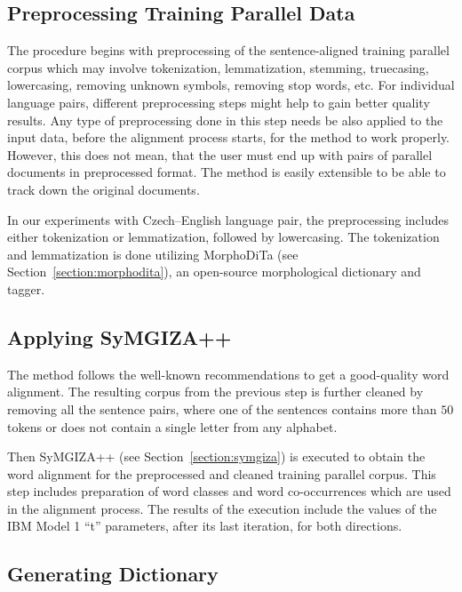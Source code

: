 \subsection{Preprocessing Training Parallel Data}
\label{subsection:preprocessing_training_parallel_data}

The procedure begins with preprocessing of the sentence-aligned training parallel corpus which may involve tokenization, lemmatization, stemming, truecasing, lowercasing, removing unknown symbols, removing stop words, etc. For individual language pairs, different preprocessing steps might help to gain better quality results. Any type of preprocessing done in this step needs be also applied to the input data, before the alignment process starts, for the method to work properly. However, this does not mean, that the user must end up with pairs of parallel documents in preprocessed format. The method is easily extensible to be able to track down the original documents. 

In our experiments with Czech--English language pair, the preprocessing includes either tokenization or lemmatization, followed by lowercasing. The tokenization and lemmatization is done utilizing MorphoDiTa (see Section~\ref{section:morphodita}), an open-source morphological dictionary and tagger.
	
\subsection{Applying SyMGIZA++}
\label{subsection:applying_symgiza}

The method follows the well-known recommendations to get a good-quality word alignment. The resulting corpus from the previous step is further cleaned by removing all the sentence pairs, where one of the sentences contains more than $50$ tokens or does not contain a single letter from any alphabet.

Then SyMGIZA++ (see Section~\ref{section:symgiza}) is executed to obtain the word alignment for the preprocessed and cleaned training parallel corpus. This step includes preparation of word classes and word co-occurrences which are used in the alignment process. The results of the execution include the values of the IBM Model 1 ``t'' parameters, after its last iteration, for both directions.

\subsection{Generating Dictionary}
\label{subsection:generating_dictionary}

